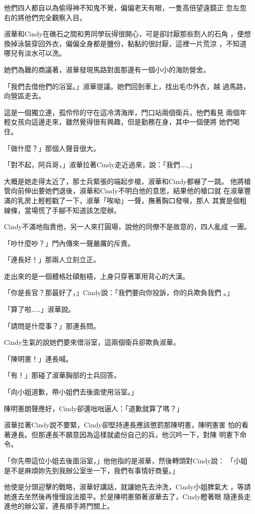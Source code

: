 他們四人都自以為偷得神不知鬼不覺，偏偏老天有眼，一隻高倍望遠鏡正
忽左忽右的將他們完全觀察入目。

淑華和Cindy在礁石之間和男同學玩得很開心，可是卻討厭那些割人的石角
，便想換掉泳裝穿回外衣，偏偏全身都是鹽份，黏黏的很討厭，這裡一片荒涼
，不知道哪兒有淡水可以洗。

她們為難的商議著，淑華發現馬路對面那邊有一個小小的海防營舍。

「我們去借他們的浴室。」淑華提議。她們回到車上，找出毛巾外衣，越
過馬路，向營區走去。

這是一個獨立連，孤伶伶的守在這冷清海岸，門口站兩個衛兵，他們看見
兩個年輕女孩向這邊走來，雖然覺得很有興趣，但是勤務在身，其中一個便將
她們喝住。

「做什麼？」那個人聲音很大。

「對不起，阿兵哥，」淑華拉著Cindy走近過來，說：「我們……」

大概是她走得太近了，那士兵緊張的端起步槍，淑華和Cindy都嚇了一跳。
他將槍管向前伸出要她們退後，淑華和Cindy不明白他的意思，結果他的槍口就
在淑華豐滿的乳房上輕輕戳了一下，淑華「唉呦」一聲，撫著胸口發嗔，那人
其實是個粗線條，當場慌了手腳不知道該怎麼辦。

Cindy不滿地指責他，另一人來打圓場，說他的同僚不是故意的，四人亂成
一團。

「吵什麼吵？」門內傳來一聲嚴厲的斥責。

「連長好！」那兩人立刻立正。

走出來的是一個體格壯碩魁梧，上身只穿著軍用背心的大漢。

「你是長官？那最好了，」Cindy說：「我們要向你投訴，你的兵欺負我們
。」

「算了啦……」淑華說。

「請問是什麼事？」那連長問。

Cindy生氣的說她們要來借浴室，這兩個衛兵卻欺負淑華。

「陳明憲！」連長喊。

「有！」那碰了淑華胸部的士兵回答。

「向小姐道歉，帶小姐們去後面使用浴室。」

陳明憲朗聲應好，Cindy卻還咄咄逼人：「道歉就算了嗎？」

淑華拉著Cindy說不要緊，Cindy卻堅持連長應該懲罰那陳明憲，陳明憲害
怕的看著連長。但那連長不願意因為這樣就處份自己的兵，他沉吟一下，對陳
明憲下命令。

「你先帶這位小姐去後面浴室，」他他指的是淑華，然後轉頭對Cindy說：
「小姐是不是麻煩妳先到我辦公室坐一下，我們有事情好商量。」

他使是分頭迎擊的戰略，淑華好講話，就讓她先去沖洗，Cindy小姐脾氣大
，等請她進去坐然後再慢慢設法擺平。於是陳明憲領著淑華去了，Cindy瞪著眼
隨連長走進他的辦公室，連長順手將門關上。

